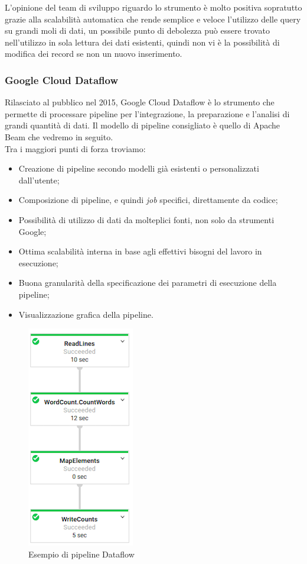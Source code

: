 L'opinione del team di sviluppo riguardo lo strumento è molto positiva sopratutto grazie alla scalabilità automatica che rende semplice e veloce l'utilizzo delle query su grandi moli di dati, un possibile punto di debolezza può essere trovato nell'utilizzo in sola lettura dei dati esistenti, quindi non vi è la possibilità di modifica dei record se non un nuovo inserimento.
\subsubsection{Google Cloud Dataflow}
Rilasciato al pubblico nel 2015, Google Cloud Dataflow è lo strumento che permette di processare pipeline per l'integrazione, la preparazione e l'analisi di grandi quantità di dati.
Il modello di pipeline consigliato è quello di Apache Beam che vedremo in seguito.
\\ Tra i maggiori punti di forza troviamo:
\begin{itemize}
	\item Creazione di pipeline secondo modelli già esistenti o personalizzati dall'utente;
	\item Composizione di pipeline, e quindi \emph{job} specifici, direttamente da codice;
	\item Possibilità di utilizzo di dati da molteplici fonti, non solo da strumenti Google;
	\item Ottima scalabilità interna in base agli effettivi bisogni del lavoro in esecuzione;
	\item Buona granularità della specificazione dei parametri di esecuzione\cite{parametridiesecuzione} della pipeline;
	\item Visualizzazione grafica della pipeline. 
\end{itemize}

\begin{figure}[h!]
	\centering
	\includegraphics[scale=1]{figures/dataflow-job-full}
	\caption[Esempio di pipeline dataflow.]{Esempio di pipeline Dataflow
		\label{fig:pipelinedataflow}}
\end{figure}	


